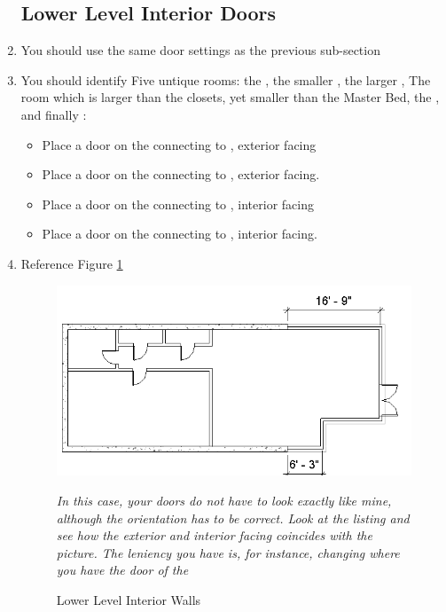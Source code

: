 \documentclass{tufte-book} %
\begin{document}
\begin{enumerate}
	\subsection{Lower Level Interior Doors}
		\item You should use the same door settings as the previous sub-section
		\item You should identify Five untique rooms: the , the smaller , the larger , The room which is larger than the closets, yet smaller than the Master Bed, the , and finally :
		\begin{itemize}
			\item Place a door on the  connecting to , exterior facing
			\item Place a door on the  connecting to , exterior facing.
			\item Place a door on the  connecting to , interior facing
			\item Place a door on the  connecting to , interior facing.
		\end{itemize}
		\item Reference Figure \ref{fig:revlowerintwalls}
		\begin{figure}
			\includegraphics[width=\linewidth]{revitlowerlevelinteriorwalls.png}
			\caption{Lower Level Interior Walls}
			\emph{In this case, your doors do not have to look exactly like mine, although the orientation has to be correct. Look at the listing and see how the exterior and interior facing coincides with the picture. The leniency you have is, for instance, changing where you have the door of the }
			\label{fig:revlowerintwalls}
		\end{figure}

\end{enumerate}
\end{document}
